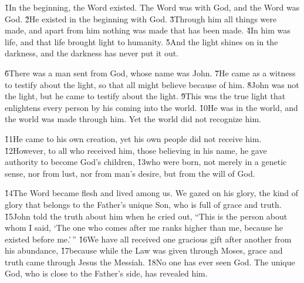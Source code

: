 


\v{1}In the beginning, the Word existed. The Word was with God, and the Word was God. \v{2}He existed in the beginning with God. \v{3}Through him all things were made, and apart from him nothing was made that has been made. \v{4}In him was life, and that life brought light to humanity. \v{5}And the light shines on in the darkness, and the darkness has never put it out.

\v{6}There was a man sent from God, whose name was John. \v{7}He came as a witness to testify about the light, so that all might believe because of him. \v{8}John was not the light, but he came to testify about the light. \v{9}This was the true light that enlightens every person by his coming into the world. \v{10}He was in the world, and the world was made through him. Yet the world did not recognize him.

\v{11}He came to his own creation, yet his own people did not receive him. \v{12}However, to all who received him, those believing in his name, he gave authority to become God's children, \v{13}who were born, not merely in a genetic sense, nor from lust, nor from man's desire, but from the will of God.

\v{14}The Word became flesh and lived among us. We gazed on his glory, the kind of glory that belongs to the Father's unique Son, who is full of grace and truth. \v{15}John told the truth about him when he cried out, ``This is the person about whom I said, `The one who comes after me ranks higher than me, because he existed before me.'\,'' \v{16}We have all received one gracious gift after another from his abundance, \v{17}because while the Law was given through Moses, grace and truth came through Jesus the Messiah. \v{18}No one has ever seen God. The unique God, who is close to the Father's side, has revealed him.

